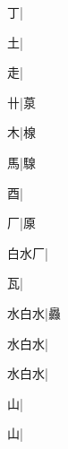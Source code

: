 \begin{multicols}{2}
{{\cjk{}{\cnsym{}　}{\cnsym{}　}丁}|{}\par
{\cjk{}{\cnsym{}　}{\cnsym{}　}土}|{}\par
{\cjk{}{\cnsym{}　}{\cnsym{}　}走}|{}\par
{\cjk{}{\cnsym{}　}{\cnsym{}　}卄}|{\cjk{}葲}\par
{\cjk{}{\cnsym{}　}{\cnsym{}　}木}|{\cjk{}楾}\par
{\cjk{}{\cnsym{}　}{\cnsym{}　}馬}|{\cjk{}騡}\par
{\cjk{}{\cnsym{}　}{\cnsym{}　}酉}|{}\par
{\cjk{}{\cnsym{}　}{\cnsym{}　}厂}|{\cjk{}厡}\par
{\cjk{}白水厂}|{}\par
{\cjk{}{\cnsym{}　}{\cnsym{}　}瓦}|{}\par
{\cjk{}水白水}|{\cjk{}灥}\par
{\cjk{}水白水}|{}\par
{\cjk{}水白水}|{}\par
{\cjk{}{\cnsym{}　}{\cnsym{}　}山}|{}\par
{\cjk{}{\cnsym{}　}{\cnsym{}　}山}|{}\par
}
\end{multicols}
